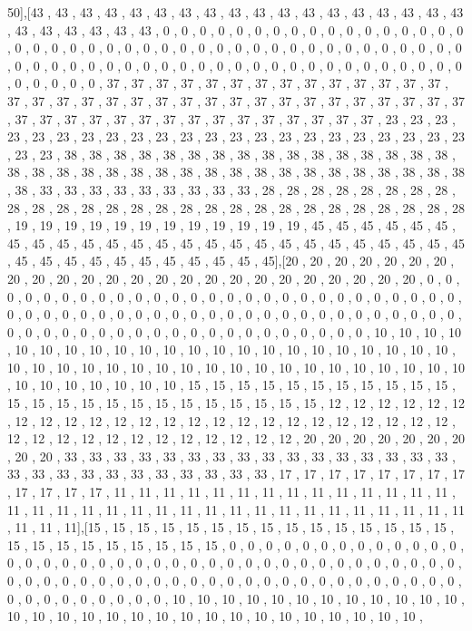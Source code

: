 50\mbox{]},\mbox{[}43 , 43 , 43 , 43 , 43 , 43 , 43 , 43 , 43 , 43 , 43 , 43 , 43 , 43 , 43 , 43 , 43 , 43 , 43 , 43 , 43 , 43 , 43 , 43 , 0 , 0 , 0 , 0 , 0 , 0 , 0 , 0 , 0 , 0 , 0 , 0 , 0 , 0 , 0 , 0 , 0 , 0 , 0 , 0 , 0 , 0 , 0 , 0 , 0 , 0 , 0 , 0 , 0 , 0 , 0 , 0 , 0 , 0 , 0 , 0 , 0 , 0 , 0 , 0 , 0 , 0 , 0 , 0 , 0 , 0 , 0 , 0 , 0 , 0 , 0 , 0 , 0 , 0 , 0 , 0 , 0 , 0 , 0 , 0 , 0 , 0 , 0 , 0 , 0 , 0 , 0 , 0 , 0 , 0 , 0 , 0 , 37 , 37 , 37 , 37 , 37 , 37 , 37 , 37 , 37 , 37 , 37 , 37 , 37 , 37 , 37 , 37 , 37 , 37 , 37 , 37 , 37 , 37 , 37 , 37 , 37 , 37 , 37 , 37 , 37 , 37 , 37 , 37 , 37 , 37 , 37 , 37 , 37 , 37 , 37 , 37 , 37 , 37 , 37 , 37 , 37 , 37 , 37 , 37 , 23 , 23 , 23 , 23 , 23 , 23 , 23 , 23 , 23 , 23 , 23 , 23 , 23 , 23 , 23 , 23 , 23 , 23 , 23 , 23 , 23 , 23 , 23 , 23 , 38 , 38 , 38 , 38 , 38 , 38 , 38 , 38 , 38 , 38 , 38 , 38 , 38 , 38 , 38 , 38 , 38 , 38 , 38 , 38 , 38 , 38 , 38 , 38 , 38 , 38 , 38 , 38 , 38 , 38 , 38 , 38 , 38 , 38 , 38 , 38 , 33 , 33 , 33 , 33 , 33 , 33 , 33 , 33 , 33 , 28 , 28 , 28 , 28 , 28 , 28 , 28 , 28 , 28 , 28 , 28 , 28 , 28 , 28 , 28 , 28 , 28 , 28 , 28 , 28 , 28 , 28 , 28 , 28 , 28 , 28 , 28 , 19 , 19 , 19 , 19 , 19 , 19 , 19 , 19 , 19 , 19 , 19 , 19 , 45 , 45 , 45 , 45 , 45 , 45 , 45 , 45 , 45 , 45 , 45 , 45 , 45 , 45 , 45 , 45 , 45 , 45 , 45 , 45 , 45 , 45 , 45 , 45 , 45 , 45 , 45 , 45 , 45 , 45 , 45 , 45 , 45 , 45 , 45 , 45\mbox{]},\mbox{[}20 , 20 , 20 , 20 , 20 , 20 , 20 , 20 , 20 , 20 , 20 , 20 , 20 , 20 , 20 , 20 , 20 , 20 , 20 , 20 , 20 , 20 , 20 , 20 , 0 , 0 , 0 , 0 , 0 , 0 , 0 , 0 , 0 , 0 , 0 , 0 , 0 , 0 , 0 , 0 , 0 , 0 , 0 , 0 , 0 , 0 , 0 , 0 , 0 , 0 , 0 , 0 , 0 , 0 , 0 , 0 , 0 , 0 , 0 , 0 , 0 , 0 , 0 , 0 , 0 , 0 , 0 , 0 , 0 , 0 , 0 , 0 , 0 , 0 , 0 , 0 , 0 , 0 , 0 , 0 , 0 , 0 , 0 , 0 , 0 , 0 , 0 , 0 , 0 , 0 , 0 , 0 , 0 , 0 , 0 , 0 , 10 , 10 , 10 , 10 , 10 , 10 , 10 , 10 , 10 , 10 , 10 , 10 , 10 , 10 , 10 , 10 , 10 , 10 , 10 , 10 , 10 , 10 , 10 , 10 , 10 , 10 , 10 , 10 , 10 , 10 , 10 , 10 , 10 , 10 , 10 , 10 , 10 , 10 , 10 , 10 , 10 , 10 , 10 , 10 , 10 , 10 , 10 , 10 , 15 , 15 , 15 , 15 , 15 , 15 , 15 , 15 , 15 , 15 , 15 , 15 , 15 , 15 , 15 , 15 , 15 , 15 , 15 , 15 , 15 , 15 , 15 , 15 , 12 , 12 , 12 , 12 , 12 , 12 , 12 , 12 , 12 , 12 , 12 , 12 , 12 , 12 , 12 , 12 , 12 , 12 , 12 , 12 , 12 , 12 , 12 , 12 , 12 , 12 , 12 , 12 , 12 , 12 , 12 , 12 , 12 , 12 , 12 , 12 , 20 , 20 , 20 , 20 , 20 , 20 , 20 , 20 , 20 , 33 , 33 , 33 , 33 , 33 , 33 , 33 , 33 , 33 , 33 , 33 , 33 , 33 , 33 , 33 , 33 , 33 , 33 , 33 , 33 , 33 , 33 , 33 , 33 , 33 , 33 , 33 , 17 , 17 , 17 , 17 , 17 , 17 , 17 , 17 , 17 , 17 , 17 , 17 , 11 , 11 , 11 , 11 , 11 , 11 , 11 , 11 , 11 , 11 , 11 , 11 , 11 , 11 , 11 , 11 , 11 , 11 , 11 , 11 , 11 , 11 , 11 , 11 , 11 , 11 , 11 , 11 , 11 , 11 , 11 , 11 , 11 , 11 , 11 , 11\mbox{]},\mbox{[}15 , 15 , 15 , 15 , 15 , 15 , 15 , 15 , 15 , 15 , 15 , 15 , 15 , 15 , 15 , 15 , 15 , 15 , 15 , 15 , 15 , 15 , 15 , 15 , 0 , 0 , 0 , 0 , 0 , 0 , 0 , 0 , 0 , 0 , 0 , 0 , 0 , 0 , 0 , 0 , 0 , 0 , 0 , 0 , 0 , 0 , 0 , 0 , 0 , 0 , 0 , 0 , 0 , 0 , 0 , 0 , 0 , 0 , 0 , 0 , 0 , 0 , 0 , 0 , 0 , 0 , 0 , 0 , 0 , 0 , 0 , 0 , 0 , 0 , 0 , 0 , 0 , 0 , 0 , 0 , 0 , 0 , 0 , 0 , 0 , 0 , 0 , 0 , 0 , 0 , 0 , 0 , 0 , 0 , 0 , 0 , 10 , 10 , 10 , 10 , 10 , 10 , 10 , 10 , 10 , 10 , 10 , 10 , 10 , 10 , 10 , 10 , 10 , 10 , 10 , 10 , 10 , 10 , 10 , 10 , 10 , 10 , 10 , 10 , 10 , 